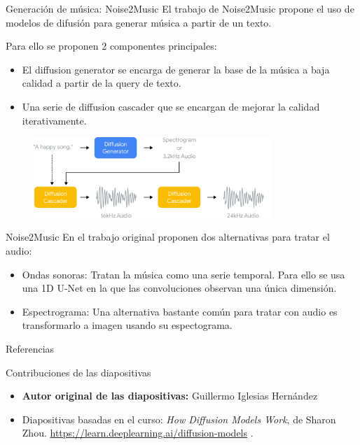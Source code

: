 \begin{frame}{Generación de música: Noise2Music}
El trabajo de \alert{Noise2Music} \cite{huang2023noise2music} propone el uso de modelos de difusión para \alert{generar música} a partir de un \alert{texto}.

Para ello se proponen 2 componentes principales:

\begin{itemize}
    \item El \alert{diffusion generator} se encarga de generar la \alert{base de la música} a baja calidad a partir de la \alert{query de texto}.
    \item Una serie de \alert{diffusion cascader} que se encargan de mejorar la \alert{calidad} iterativamente.
\end{itemize}

\begin{figure}
    \centering
    \includegraphics[width=0.8\textwidth]{Slides/figures/Diffusion_Models/Noise2Music.png}
    \caption{\cite{huang2023noise2music}}
\end{figure}
\end{frame}

\begin{frame}{Noise2Music}
En el trabajo original proponen dos alternativas para tratar el audio:
\begin{itemize}
    \item \alert{Ondas sonoras}: Tratan la música como una serie temporal. Para ello se usa 
    una \alert{1D U-Net} en la que las convoluciones observan una única dimensión.
    
    \item \alert{Espectrograma}: Una alternativa bastante común para tratar con audio es transformarlo a imagen usando su \alert{espectograma}.
\end{itemize}
\end{frame}


\begin{frame}[allowframebreaks]{Referencias}
    
    
\end{frame}

\begin{frame}{Contribuciones de las diapositivas}
\begin{itemize}
    \item \textbf{Autor original de las diapositivas:} Guillermo Iglesias Hernández
    \item Diapositivas basadas en el curso: \textit{How Diffusion Models Work}, de Sharon Zhou. \url{https://learn.deeplearning.ai/diffusion-models} \cite{DeepLearningDifussionModelCourse}.
\end{itemize}
\end{frame}

